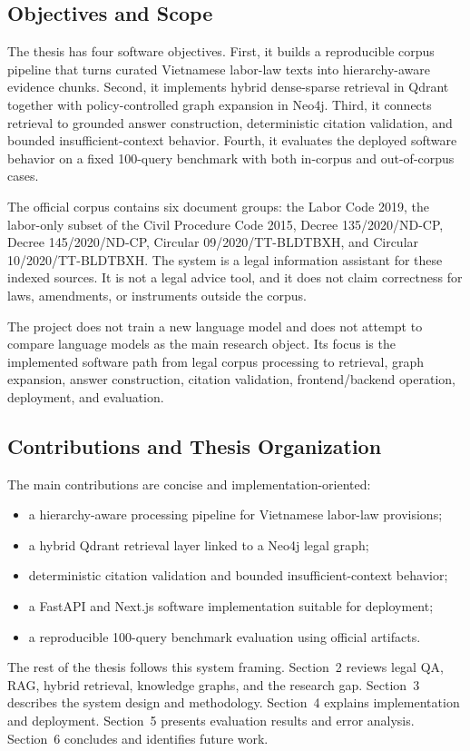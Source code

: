 \subsection{Objectives and Scope}
The thesis has four software objectives. First, it builds a reproducible corpus pipeline that turns curated Vietnamese labor-law texts into hierarchy-aware evidence chunks. Second, it implements hybrid dense-sparse retrieval in Qdrant together with policy-controlled graph expansion in Neo4j. Third, it connects retrieval to grounded answer construction, deterministic citation validation, and bounded insufficient-context behavior. Fourth, it evaluates the deployed software behavior on a fixed 100-query benchmark with both in-corpus and out-of-corpus cases.

The official corpus contains six document groups: the Labor Code 2019, the labor-only subset of the Civil Procedure Code 2015, Decree 135/2020/ND-CP, Decree 145/2020/ND-CP, Circular 09/2020/TT-BLDTBXH, and Circular 10/2020/TT-BLDTBXH. The system is a legal information assistant for these indexed sources. It is not a legal advice tool, and it does not claim correctness for laws, amendments, or instruments outside the corpus.

The project does not train a new language model and does not attempt to compare language models as the main research object. Its focus is the implemented software path from legal corpus processing to retrieval, graph expansion, answer construction, citation validation, frontend/backend operation, deployment, and evaluation.

\subsection{Contributions and Thesis Organization}
The main contributions are concise and implementation-oriented:
\begin{itemize}
  \item a hierarchy-aware processing pipeline for Vietnamese labor-law provisions;
  \item a hybrid Qdrant retrieval layer linked to a Neo4j legal graph;
  \item deterministic citation validation and bounded insufficient-context behavior;
  \item a FastAPI and Next.js software implementation suitable for deployment;
  \item a reproducible 100-query benchmark evaluation using official artifacts.
\end{itemize}

The rest of the thesis follows this system framing. Section~2 reviews legal QA, RAG, hybrid retrieval, knowledge graphs, and the research gap. Section~3 describes the system design and methodology. Section~4 explains implementation and deployment. Section~5 presents evaluation results and error analysis. Section~6 concludes and identifies future work.
